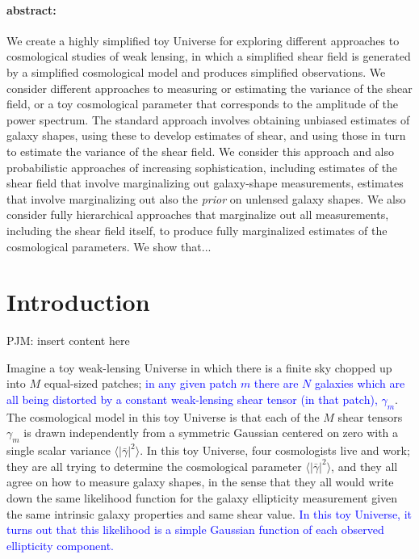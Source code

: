 \documentclass[12pt]{article}
\def\shearvar{\langle |\bar{\gamma}|^2\rangle}
\def\phil#1{\textcolor{blue}{#1}}
\begin{document}
\paragraph{abstract:}
We create a highly simplified toy Universe for exploring different
approaches to cosmological studies of weak lensing, in which a
simplified shear field is generated by a simplified cosmological model
and produces simplified observations.  We consider different
approaches to measuring or estimating the variance of the shear field,
or a toy cosmological parameter that corresponds to the amplitude of
the power spectrum.  The standard approach involves obtaining unbiased
estimates of galaxy shapes, using these to develop estimates of shear,
and using those in turn to estimate the variance of the shear field.
We consider this approach and also probabilistic approaches of
increasing sophistication, including estimates of the shear field that
involve marginalizing out galaxy-shape measurements, estimates that
involve marginalizing out also the \emph{prior} on unlensed galaxy
shapes.  We also consider fully hierarchical approaches that
marginalize out all measurements, including the shear field itself, to
produce fully marginalized estimates of the cosmological parameters.
We show that...

\section{Introduction}

PJM: insert content here


Imagine a toy weak-lensing Universe in which there is a finite sky chopped up
into $M$ equal-sized patches; \phil{in any given patch $m$ there are $N$
galaxies which are all being  distorted by a constant weak-lensing shear
tensor (in that patch), $\gamma_m$}.  The cosmological model in this toy
Universe is that each of the $M$ shear tensors $\gamma_m$ is drawn
independently from a symmetric Gaussian centered on zero with a single scalar
variance $\shearvar$.  In this toy Universe, four cosmologists live and work;
they are all trying to determine the cosmological parameter $\shearvar$, and
they all agree on how to measure galaxy shapes, in the sense that they all
would write down the same likelihood function for the galaxy ellipticity
measurement given the same intrinsic galaxy properties and same shear value.
\phil{In this toy Universe, it turns out that this likelihood is a simple
Gaussian function of each observed ellipticity component.}
\end{document}
